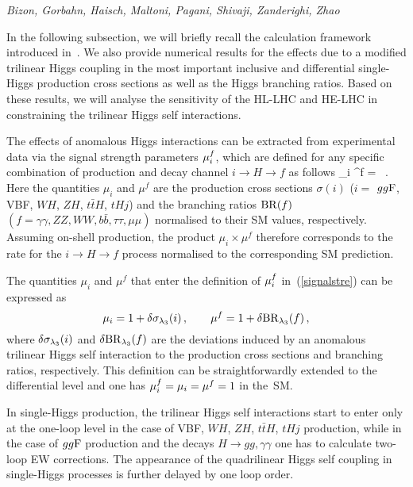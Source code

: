 \begin{center}
\textit{Bizon, Gorbahn, Haisch, Maltoni, Pagani, Shivaji, Zanderighi, Zhao}
\end{center}

In the following subsection, we will briefly recall the calculation framework introduced in~\cite{Gorbahn:2016uoy,Degrassi:2016wml}. We also provide  numerical results for the effects due to a modified  trilinear Higgs coupling in the most important inclusive and differential single-Higgs production cross sections as well as the Higgs branching ratios. Based on these results, we will analyse the sensitivity of the HL-LHC and HE-LHC in constraining the trilinear Higgs self interactions. 

\label{tril-single:theo}

The effects of anomalous Higgs interactions can be extracted from experimental data via the signal strength parameters $\mu_i^f$, which
are defined for any specific combination of production and decay channel $i \to H \to f$ as follows 
\be \label{signalstre}
\muif \equiv \mu_i \times \mu^f =  \times {} \, .
\ee 
Here the quantities $\mu_i$ and $\mu^f$ are   the production cross sections $\sigma(i)$ ($i=$ $gg{\rm F}$, {\rm VBF}, $WH$, $ZH$, $t \bar tH$, $tHj$) and the branching ratios ${\rm BR}(f)$ $(f= \gamma\gamma, ZZ, WW, b\bar{b}, \tau\tau, \mu\mu)$ normalised to their SM values, respectively. Assuming on-shell production, the product $\mu_i \times \mu^f$  therefore corresponds to the rate for the $i \to H \to f$ process  normalised to the corresponding SM prediction.

The quantities $\mu_i$ and $\mu^f$ that enter the definition of  $\mu_i^f$ in~(\ref{signalstre})  can be expressed as
\begin{equation} \label{eq:muf}
\mu_i = 1 + \delta \sigma_{\lambda_{3}}(i) \,,  \qquad 
\mu^f = 1 + \delta {\rm BR}_{\lambda_{3}}(f) \,,
\end{equation}
where $\delta \sigma_{\lambda_{3}}(i)$ and $\delta {\rm BR}_{\lambda_{3}}(f)$ are the deviations induced by an anomalous trilinear Higgs self interaction to the production cross sections and branching ratios, respectively.
This definition can be straightforwardly extended to the differential level and one has $\mu_i^f=\mu_i=\mu^f=1$ in the~SM.

In single-Higgs production, the trilinear Higgs self interactions start to enter only at the one-loop level in the case of VBF, $WH$, $ZH$, $t \bar tH$, $tHj$ production, while in the case of $gg{\rm F}$ production and the decays $H\to gg, \gamma \gamma$ one has to calculate two-loop EW corrections. The appearance of the quadrilinear Higgs self coupling in single-Higgs processes is further delayed by one loop order.

